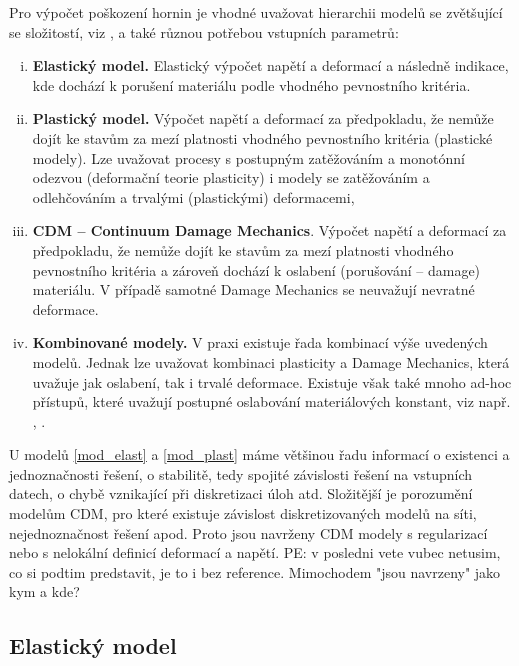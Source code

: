 \documentclass{article}
\newcommand{\pe}[1]{{\color{orange} PE: #1}}
\begin{document}
Pro výpočet poškození hornin je vhodné uvažovat hierarchii modelů se zvětšující se složitostí, viz \cite{Blaheta2013a}, a také různou potřebou vstupních parametrů:
\begin{enumerate}[(i)]
	\item \label{mod_elast} {\bf Elastický model.} Elastický výpočet napětí a deformací a následně indikace, kde dochází k porušení materiálu podle vhodného pevnostního kritéria.
	\item \label{mod_plast} {\bf Plastický model.} Výpočet napětí a deformací za předpokladu, že nemůže dojít ke stavům za mezí platnosti vhodného pevnostního kritéria (plastické modely). Lze uvažovat procesy s postupným zatěžováním a monotónní odezvou (deformační teorie plasticity) i modely se zatěžováním a odlehčováním a trvalými (plastickými) deformacemi,
	\item \label{mod_damage} {\bf CDM -- Continuum Damage Mechanics}. Výpočet napětí a deformací za předpokladu, že nemůže dojít ke stavům za mezí platnosti vhodného pevnostního kritéria a zároveň dochází k oslabení (porušování --  damage) materiálu. V případě samotné Damage Mechanics se neuvažují nevratné deformace.
	\item \label{mod_irev_cdm} {\bf Kombinované modely.} V praxi existuje řada kombinací výše uvedených modelů. Jednak lze uvažovat kombinaci plasticity a Damage Mechanics, která uvažuje jak oslabení, tak i trvalé deformace. Existuje však také mnoho ad-hoc přístupů, které uvažují postupné oslabování materiálových konstant, viz např. \cite{Perras2016}, \cite{Carranza-Torres1999}.
\end{enumerate}
U modelů \eqref{mod_elast} a \eqref{mod_plast} máme většinou řadu informací o existenci a jednoznačnosti
řešení, o stabilitě, tedy spojité závislosti řešení na vstupních datech, o chybě vznikající  při  diskretizaci  úloh  atd.  Složitější je porozumění  modelům CDM, pro které existuje závislost diskretizovaných  modelů na  síti, nejednoznačnost řešení  apod. Proto jsou navrženy CDM modely s regularizací nebo s nelokální definicí deformací a napětí. \pe{v posledni vete vubec netusim, co si podtim predstavit, je to i bez reference. Mimochodem "jsou navrzeny" jako kym a kde?}



\subsection{Elastický model}
\end{document}

